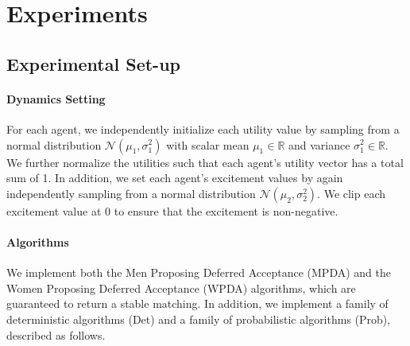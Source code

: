 \section{Experiments}
\subsection{Experimental Set-up}
\paragraph{Dynamics Setting} For each agent, we independently initialize each utility value by sampling from a normal distribution $\mathcal{N}(\mu_1, \sigma_1^2)$ with scalar mean $\mu_1 \in \mathbb{R}$ and variance $\sigma_1^2 \in \mathbb{R}$. We further normalize the utilities such that each agent's utility vector has a total sum of 1. In addition, we set each agent's excitement values by again independently sampling from a normal distribution $\mathcal{N}(\mu_2, \sigma_2^2)$. We clip each excitement value at 0 to ensure that the excitement is non-negative.

\paragraph{Algorithms} We implement both the Men Proposing Deferred Acceptance (MPDA) and the Women Proposing Deferred Acceptance (WPDA) algorithms, which are guaranteed to return a stable matching. In addition, we implement a family of deterministic algorithms (Det) and a family of probabilistic algorithms (Prob), described as follows.

